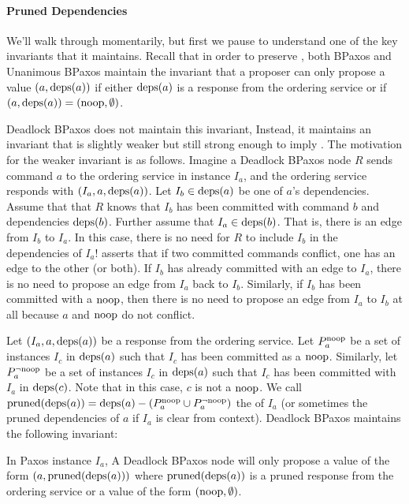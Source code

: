 \paragraph{Pruned Dependencies}
We'll walk through  momentarily, but first we pause to
understand one of the key invariants that it maintains. Recall that in order to
preserve , both BPaxos and Unanimous BPaxos maintain
the invariant that a proposer can only propose a value $(a, \text{deps}(a))$ if
either $\text{deps}(a)$ is a response from the ordering service or if $(a, \text{deps}(a))
= (\text{noop}, \emptyset)$.

Deadlock BPaxos does not maintain this invariant, Instead, it maintains an
invariant that is slightly weaker but still strong enough to imply
. The motivation for the weaker invariant is as
follows. Imagine a Deadlock BPaxos node $R$ sends command $a$ to the ordering
service in instance $I_a$, and the ordering service responds with $(I_a, a,
\text{deps}(a))$. Let $I_b \in \text{deps}(a)$ be one of $a$'s dependencies. Assume that
that $R$ knows that $I_b$ has been committed with command $b$ and dependencies
$\text{deps}(b)$. Further assume that $I_a \in \text{deps}(b)$. That is, there is an edge
from $I_b$ to $I_a$. In this case, there is no need for $R$ to include $I_b$ in
the dependencies of $I_a$!  asserts that if two
committed commands conflict, one has an edge to the other (or both). If $I_b$
has already committed with an edge to $I_a$, there is no need to propose an
edge from $I_a$ back to $I_b$.
%
Similarly, if $I_b$ has been committed with a $\text{noop}$, then there is no need to
propose an edge from $I_a$ to $I_b$ at all because $a$ and $\text{noop}$ do not
conflict.

Let $(I_a, a, \text{deps}(a))$ be a response from the ordering service. Let
$P^{\text{noop}}_{a}$ be a set of instances $I_c$ in $\text{deps}(a)$ such that $I_c$ has been
committed as a $\text{noop}$. Similarly, let $P^{\lnot \text{noop}}_{a}$ be a set of instances
$I_c$ in $\text{deps}(a)$ such that $I_c$ has been committed with $I_a$ in
$\text{deps}(c)$. Note that in this case, $c$ is not a $\text{noop}$. We call
$\text{pruned}(\text{deps}(a)) = \text{deps}(a) - (P^{\text{noop}}_{a} \cup P^{\lnot \text{noop}}_{a})$ the
 of $I_a$ (or sometimes the pruned dependencies of
$a$ if $I_a$ is clear from context).  Deadlock BPaxos maintains the following
invariant:

\begin{boxedinvariant}
  In Paxos instance $I_a$, A Deadlock BPaxos node will only propose a value of
  the form $(a, \text{pruned}(\text{deps}(a)))$ where $\text{pruned}(\text{deps}(a))$ is a pruned
  response from the ordering service or a value of the form $(\text{noop},
  \emptyset)$.
\end{boxedinvariant}

